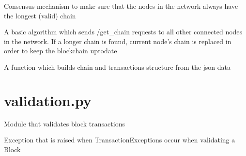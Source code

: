 \documentclass[letterpaper,10pt,english]{sphinxmanual}
\begin{document}

\begin{fulllineitems}
\label{\detokenize{index:blockchain.consensus_mechanism}}
Consensus mechanism to make sure that the nodes in
the network always have the longest (valid) chain

A basic algorithm which sends /get\_chain requests
to all other connected nodes in the network.
If a longer chain is found, current node’s chain is
replaced in order to keep the blockchain up\sphinxhyphen{}to\sphinxhyphen{}date

\end{fulllineitems}


\begin{fulllineitems}
\label{\detokenize{index:blockchain.construct_chain_again}}
A function which builds chain and transactions structure
from the json data

\end{fulllineitems}

\label{\detokenize{index:module-validation}}

\section{validation.py}
\label{\detokenize{index:validation-py}}
Module that validates block transactions

\begin{fulllineitems}
\label{\detokenize{index:validation.BlockException}}
Exception that is raised when TransactionExceptions occur when
validating a Block

\end{fulllineitems}
\end{document}

